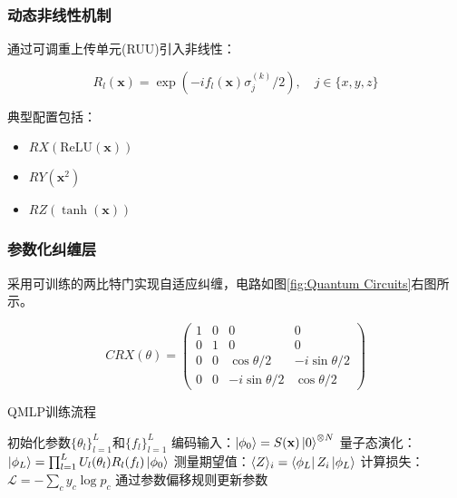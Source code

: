 \documentclass[10pt,a4paper,twoside]{article}
\numberwithin{figure}{section}%
\numberwithin{table}{section}%
\begin{document}
\subsubsection{动态非线性机制}

通过可调重上传单元(RUU)引入非线性：

\begin{equation}
    R_l(\mathbf{x}) = \exp\left(-i f_l(\mathbf{x}) \sigma_j^{(k)}/2\right), \quad j \in \{x,y,z\}
\end{equation}

典型配置包括：

\begin{itemize}
    \item $RX(\text{ReLU}(\mathbf{x}))$
    \item $RY(\mathbf{x}^2)$
    \item $RZ(\tanh(\mathbf{x}))$
\end{itemize}


\subsubsection{参数化纠缠层}

采用可训练的两比特门实现自适应纠缠，电路如图\ref{fig:Quantum Circuits}右图所示。

\begin{equation}
    CRX(\theta) = \begin{pmatrix}
    1 & 0 & 0 & 0 \\
    0 & 1 & 0 & 0 \\
    0 & 0 & \cos\theta/2 & -i\sin\theta/2 \\
    0 & 0 & -i\sin\theta/2 & \cos\theta/2 
    \end{pmatrix}
\end{equation}

\begin{algorithm}
    \caption{QMLP训练流程}
    \begin{algorithmic}[1]
    \State 初始化参数$\{\theta_l\}_{l=1}^L$和$\{f_l\}_{l=1}^L$
        \State 编码输入：$\ket{\phi_0} = S(\mathbf{x})\ket{0}^{\otimes N}$
        \State 量子态演化：$\ket{\phi_L} = \prod_{l=1}^L U_l(\theta_l) R_l(f_l) \ket{\phi_0}$
        \State 测量期望值：$\langle Z\rangle_i = \bra{\phi_L} Z_i \ket{\phi_L}$
        \State 计算损失：$\mathcal{L} = -\sum_c y_c \log p_c$
        \State 通过参数偏移规则更新参数
    \EndFor
    \end{algorithmic}
\end{algorithm}
\end{document}

